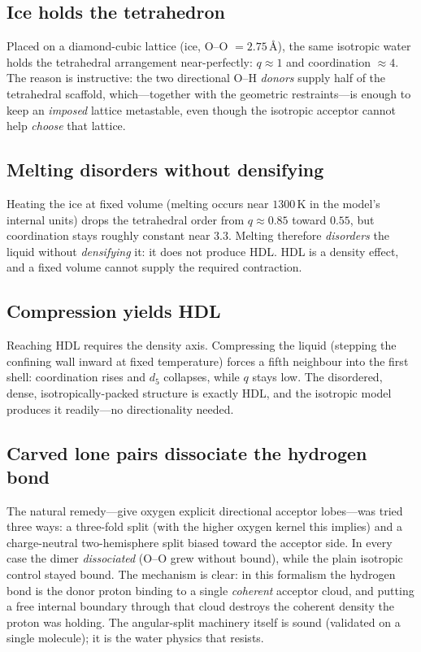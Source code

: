 \documentclass[11pt]{article}
\begin{document}
\subsection{Ice holds the tetrahedron}
Placed on a diamond-cubic lattice (ice, O--O $=2.75$\,\AA), the same isotropic water holds
the tetrahedral arrangement near-perfectly: $q\approx1$ and coordination $\approx4$. The
reason is instructive: the two directional O--H \emph{donors} supply half of the tetrahedral
scaffold, which---together with the geometric restraints---is enough to keep an
\emph{imposed} lattice metastable, even though the isotropic acceptor cannot help
\emph{choose} that lattice.

\subsection{Melting disorders without densifying}
Heating the ice at fixed volume (melting occurs near $1300$\,K in the model's internal
units) drops the tetrahedral order from $q\approx0.85$ toward $0.55$, but coordination
stays roughly constant near $3.3$. Melting therefore \emph{disorders} the liquid without
\emph{densifying} it: it does not produce HDL. HDL is a density effect, and a fixed volume
cannot supply the required contraction.

\subsection{Compression yields HDL}
Reaching HDL requires the density axis. Compressing the liquid (stepping the confining wall
inward at fixed temperature) forces a fifth neighbour into the first shell: coordination
rises and $d_5$ collapses, while $q$ stays low. The disordered, dense, isotropically-packed
structure is exactly HDL, and the isotropic model produces it readily---no directionality
needed.

\subsection{Carved lone pairs dissociate the hydrogen bond}
The natural remedy---give oxygen explicit directional acceptor lobes---was tried three ways:
a three-fold split (with the higher oxygen kernel this implies) and a charge-neutral
two-hemisphere split biased toward the acceptor side. In every case the dimer
\emph{dissociated} (O--O grew without bound), while the plain isotropic control stayed bound.
The mechanism is clear: in this formalism the hydrogen bond is the donor proton binding to a
single \emph{coherent} acceptor cloud, and putting a free internal boundary through that
cloud destroys the coherent density the proton was holding. The angular-split machinery
itself is sound (validated on a single molecule); it is the water physics that resists.
\end{document}
